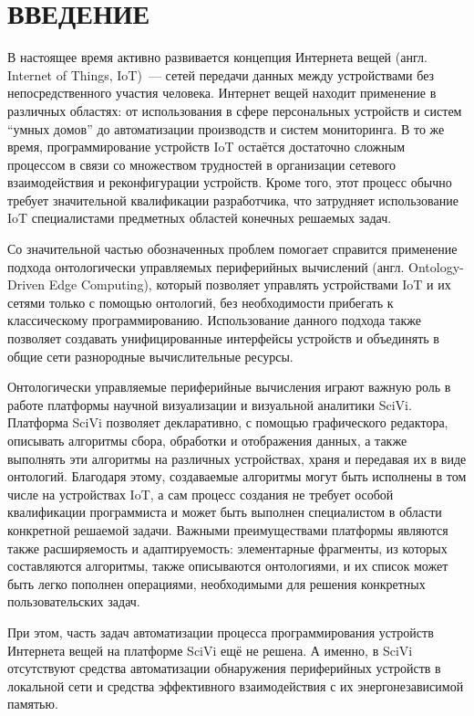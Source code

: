 \chapter*{ВВЕДЕНИЕ}

В настоящее время активно развивается концепция Интернета вещей (англ. Internet of Things, IoT)~--- сетей передачи данных между устройствами без непосредственного участия человека.
Интернет вещей находит применение в различных областях: от использования в сфере персональных устройств и систем "`умных домов"' до автоматизации производств и систем мониторинга.
В то же время, программирование устройств IoT остаётся достаточно сложным процессом в связи со множеством трудностей в организации сетевого взаимодействия и реконфигурации устройств.
Кроме того, этот процесс обычно требует значительной квалификации разработчика, что затрудняет использование IoT специалистами предметных областей конечных решаемых задач.

Со значительной частью обозначенных проблем помогает справится применение подхода онтологически управляемых периферийных вычислений (англ. Ontology-Driven Edge Computing), который позволяет управлять устройствами IoT и их сетями только с помощью онтологий, без необходимости прибегать к классическому программированию\cite{incollection:odec}.
Использование данного подхода также позволяет создавать унифицированные интерфейсы устройств и объединять в общие сети разнородные вычислительные ресурсы\cite{incollection:eon-communications}.

Онтологически управляемые периферийные вычисления играют важную роль в работе платформы научной визуализации и визуальной аналитики SciVi\cite{article:scivi, article:scivi-overview}.
Платформа SciVi позволяет декларативно, с помощью графического редактора, описывать алгоритмы сбора, обработки и отображения данных, а также выполнять эти алгоритмы на различных устройствах, храня и передавая их в виде онтологий.
Благодаря этому, создаваемые алгоритмы могут быть исполнены в том числе на устройствах IoT, а сам процесс создания не требует особой квалификации программиста и может быть выполнен специалистом в области конкретной решаемой задачи.
Важными преимуществами платформы являются также расширяемость и адаптируемость: элементарные фрагменты, из которых составляются алгоритмы, также описываются онтологиями, и их список может быть легко пополнен операциями, необходимыми для решения конкретных пользовательских задач.

При этом, часть задач автоматизации процесса программирования устройств Интернета вещей на платформе SciVi ещё не решена. А именно, в SciVi отсутствуют средства автоматизации обнаружения периферийных устройств в локальной сети и средства эффективного взаимодействия с их энергонезависимой памятью.

